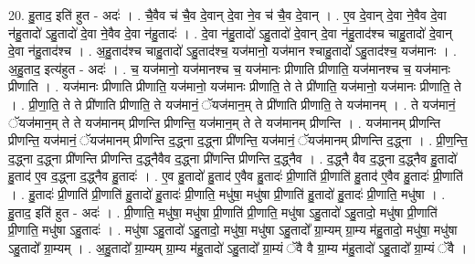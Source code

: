 \documentclass[17pt]{extarticle}
\begin{document}
20. हु॒ताद॒ इति॑ हुत - अदः॑ । . चै॒वैव च॑ चै॒व दे॒वान् दे॒वा ने॒व च॑ चै॒व दे॒वान् । . ए॒व दे॒वान् दे॒वा ने॒वैव दे॒वा न॑हु॒तादो॑ ऽहु॒तादो॑ दे॒वा ने॒वैव दे॒वा न॑हु॒तादः॑ । . दे॒वा न॑हु॒तादो॑ ऽहु॒तादो॑ दे॒वान् दे॒वा न॑हु॒ताद॑श्च चाहु॒तादो॑ दे॒वान् दे॒वा न॑हु॒ताद॑श्च । . अ॒हु॒ताद॑श्च चाहु॒तादो॑ ऽहु॒ताद॑श्च॒ यज॑मानो॒ यज॑मान श्चाहु॒तादो॑ ऽहु॒ताद॑श्च॒ यज॑मानः । . अ॒हु॒ताद॒ इत्य॑हुत - अदः॑ । . च॒ यज॑मानो॒ यज॑मानश्च च॒ यज॑मानः प्रीणाति प्रीणाति॒ यज॑मानश्च च॒ यज॑मानः प्रीणाति । . यज॑मानः प्रीणाति प्रीणाति॒ यज॑मानो॒ यज॑मानः प्रीणाति॒ ते ते प्री॑णाति॒ यज॑मानो॒ यज॑मानः प्रीणाति॒ ते । . प्री॒णा॒ति॒ ते ते प्री॑णाति प्रीणाति॒ ते यज॑मानं॒ ॅयज॑मान॒म् ते प्री॑णाति प्रीणाति॒ ते यज॑मानम् । . ते यज॑मानं॒ ॅयज॑मान॒म् ते ते यज॑मानम् प्रीणन्ति प्रीणन्ति॒ यज॑मान॒म् ते ते यज॑मानम् प्रीणन्ति । . यज॑मानम् प्रीणन्ति प्रीणन्ति॒ यज॑मानं॒ ॅयज॑मानम् प्रीणन्ति द॒द्ध्ना द॒द्ध्ना प्री॑णन्ति॒ यज॑मानं॒ ॅयज॑मानम् प्रीणन्ति द॒द्ध्ना । . प्री॒ण॒न्ति॒ द॒द्ध्ना द॒द्ध्ना प्री॑णन्ति प्रीणन्ति द॒द्ध्नैवैव द॒द्ध्ना प्री॑णन्ति प्रीणन्ति द॒द्ध्नैव । . द॒द्ध्नै वैव द॒द्ध्ना द॒द्ध्नैव हु॒तादो॑ हु॒ताद॑ ए॒व द॒द्ध्ना द॒द्ध्नैव हु॒तादः॑ । . ए॒व हु॒तादो॑ हु॒ताद॑ ए॒वैव हु॒तादः॑ प्री॒णाति॑ प्री॒णाति॑ हु॒ताद॑ ए॒वैव हु॒तादः॑ प्री॒णाति॑ । . हु॒तादः॑ प्री॒णाति॑ प्री॒णाति॑ हु॒तादो॑ हु॒तादः॑ प्री॒णाति॒ मधु॑षा॒ मधु॑षा प्री॒णाति॑ हु॒तादो॑ हु॒तादः॑ प्री॒णाति॒ मधु॑षा । . हु॒ताद॒ इति॑ हुत - अदः॑ । . प्री॒णाति॒ मधु॑षा॒ मधु॑षा प्री॒णाति॑ प्री॒णाति॒ मधु॑षा ऽहु॒तादो॑ ऽहु॒तादो॒ मधु॑षा प्री॒णाति॑ प्री॒णाति॒ मधु॑षा ऽहु॒तादः॑ । . मधु॑षा ऽहु॒तादो॑ ऽहु॒तादो॒ मधु॑षा॒ मधु॑षा ऽहु॒तादो᳚ ग्रा॒म्यम् ग्रा॒म्य म॑हु॒तादो॒ मधु॑षा॒ मधु॑षा ऽहु॒तादो᳚ ग्रा॒म्यम् । . अ॒हु॒तादो᳚ ग्रा॒म्यम् ग्रा॒म्य म॑हु॒तादो॑ ऽहु॒तादो᳚ ग्रा॒म्यं ॅवै वै ग्रा॒म्य म॑हु॒तादो॑ ऽहु॒तादो᳚ ग्रा॒म्यं ॅवै । \newline
\end{document}
